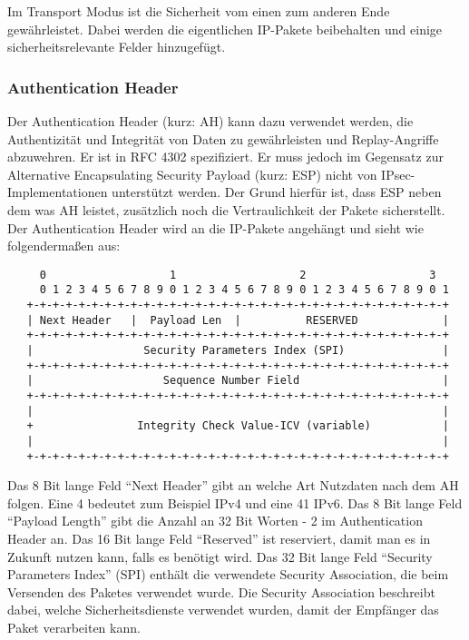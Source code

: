\documentclass[12pt]{scrartcl}
\begin{document}
Im Transport Modus ist die Sicherheit vom einen zum anderen Ende gewährleistet. Dabei werden die eigentlichen IP-Pakete beibehalten und einige sicherheitsrelevante Felder hinzugefügt.

\subsubsection{Authentication Header}
Der Authentication Header (kurz: AH) kann dazu verwendet werden, die Authentizität und Integrität von Daten zu gewährleisten und Replay-Angriffe abzuwehren. Er ist in RFC 4302 spezifiziert.\cite{RFC4302} Er muss jedoch im Gegensatz zur Alternative Encapsulating Security Payload (kurz: ESP) nicht von IPsec-Implementationen unterstützt werden.\cite{RFC4301} Der Grund hierfür ist, dass ESP neben dem was AH leistet, zusätzlich noch die Vertraulichkeit der Pakete sicherstellt. Der Authentication Header wird an die IP-Pakete angehängt und sieht wie folgendermaßen aus:

\begin{addmargin}[-2em]{0em}
\begin{verbatim}
     0                   1                   2                   3
     0 1 2 3 4 5 6 7 8 9 0 1 2 3 4 5 6 7 8 9 0 1 2 3 4 5 6 7 8 9 0 1
   +-+-+-+-+-+-+-+-+-+-+-+-+-+-+-+-+-+-+-+-+-+-+-+-+-+-+-+-+-+-+-+-+
   | Next Header   |  Payload Len  |          RESERVED             |
   +-+-+-+-+-+-+-+-+-+-+-+-+-+-+-+-+-+-+-+-+-+-+-+-+-+-+-+-+-+-+-+-+
   |                 Security Parameters Index (SPI)               |
   +-+-+-+-+-+-+-+-+-+-+-+-+-+-+-+-+-+-+-+-+-+-+-+-+-+-+-+-+-+-+-+-+
   |                    Sequence Number Field                      |
   +-+-+-+-+-+-+-+-+-+-+-+-+-+-+-+-+-+-+-+-+-+-+-+-+-+-+-+-+-+-+-+-+
   |                                                               |
   +                Integrity Check Value-ICV (variable)           |
   |                                                               |
   +-+-+-+-+-+-+-+-+-+-+-+-+-+-+-+-+-+-+-+-+-+-+-+-+-+-+-+-+-+-+-+-+
  \end{verbatim}
\end{addmargin}
Das 8 Bit lange Feld "`Next Header"' gibt an welche Art Nutzdaten nach dem AH folgen. Eine 4 bedeutet zum Beispiel IPv4 und eine 41 IPv6. Das 8 Bit lange Feld "`Payload Length"' gibt die Anzahl an 32 Bit Worten - 2 im Authentication Header an. Das 16 Bit lange Feld "`Reserved"' ist reserviert, damit man es in Zukunft nutzen kann, falls es benötigt wird. Das 32 Bit lange Feld "`Security Parameters Index"' (SPI) enthält die verwendete Security Association, die beim Versenden des Paketes verwendet wurde. Die Security Association beschreibt dabei, welche Sicherheitsdienste verwendet wurden, damit der Empfänger das Paket verarbeiten kann. 
\end{document}
